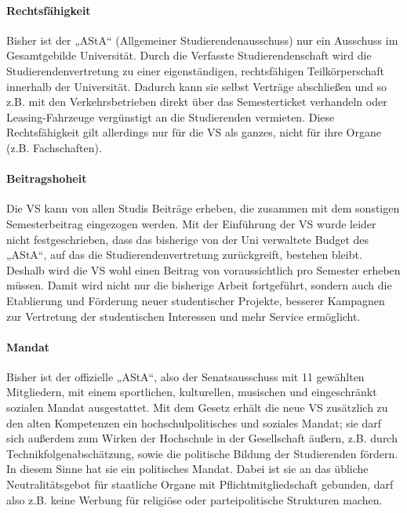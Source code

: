 \paragraph{Rechtsfähigkeit}

Bisher ist der „AStA“ (Allgemeiner Studierendenausschuss) nur ein Ausschuss
im Gesamtgebilde Universität. Durch die Verfasste Studierendenschaft wird
die Studierendenvertretung zu einer eigenständigen, rechtsfähigen Teilkörperschaft
innerhalb der Universität. Dadurch kann sie selbst Verträge abschließen und
so z.B. mit den Verkehrsbetrieben direkt über das Semesterticket verhandeln
oder Leasing-Fahrzeuge vergünstigt an die Studierenden vermieten.
Diese Rechtsfähigkeit gilt allerdings nur für die VS als ganzes,
nicht für ihre Organe (z.B. Fachschaften).

\paragraph{Beitragshoheit}

Die VS kann von allen Studis Beiträge erheben, die zusammen mit dem
sonstigen Semesterbeitrag eingezogen werden. Mit der Einführung der VS
wurde leider nicht festgeschrieben, dass das bisherige von der Uni verwaltete
Budget des „AStA“, auf das die Studierendenvertretung zurückgreift,
bestehen bleibt. Deshalb wird die VS wohl einen Beitrag von voraussichtlich
 pro Semester erheben müssen. Damit wird nicht nur die
bisherige Arbeit fortgeführt, sondern auch die Etablierung und Förderung
neuer studentischer Projekte, besserer Kampagnen zur Vertretung der
studentischen Interessen und mehr Service ermöglicht.

\paragraph{Mandat}

Bisher ist der offizielle „AStA“, also der Senatsausschuss mit 11 gewählten
Mitgliedern, mit einem sportlichen, kulturellen, musischen und eingeschränkt
sozialen Mandat ausgestattet.
Mit dem Gesetz erhält die neue VS zusätzlich zu den alten Kompetenzen ein
hochschulpolitisches und soziales Mandat; sie darf sich außerdem zum Wirken
der Hochschule in der Gesellschaft äußern, z.B. durch Technikfolgenabschätzung,
sowie die politische Bildung der Studierenden fördern. In diesem Sinne hat
sie ein politisches Mandat. Dabei ist sie an das übliche Neutralitätsgebot
für staatliche Organe mit Pflichtmitgliedschaft gebunden, darf also z.B.
keine Werbung für religiöse oder parteipolitische Strukturen machen.

